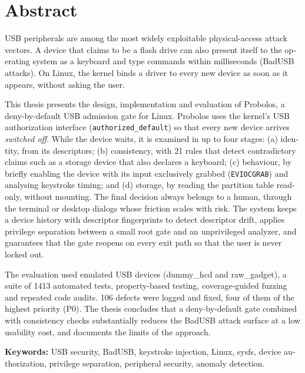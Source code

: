 \chapter*{Abstract}
\thispagestyle{plain}

\begin{english}
USB peripherals are among the most widely exploitable physical-access attack
vectors. A device that claims to be a flash drive can also present itself to the
operating system as a keyboard and type commands within milliseconds (BadUSB
attacks). On Linux, the kernel binds a driver to every new device as soon as it
appears, without asking the user.

This thesis presents the design, implementation and evaluation of
\textsf{Probolos}, a deny-by-default USB admission gate for Linux. Probolos uses
the kernel's USB authorization interface (\texttt{authorized\_default}) so that
every new device arrives \emph{switched off}. While the device waits, it is
examined in up to four stages: (a) identity, from its descriptors; (b)
consistency, with 21 rules that detect contradictory claims such as a storage
device that also declares a keyboard; (c) behaviour, by briefly enabling the
device with its input exclusively grabbed (\texttt{EVIOCGRAB}) and analysing
keystroke timing; and (d) storage, by reading the partition table read-only,
without mounting. The final decision always belongs to a human, through the
terminal or desktop dialogs whose friction scales with risk. The system keeps a
device history with descriptor fingerprints to detect descriptor drift, applies
privilege separation between a small root gate and an unprivileged analyzer,
and guarantees that the gate reopens on every exit path so that the user is
never locked out.

The evaluation used emulated USB devices (dummy\_hcd and raw\_gadget), a suite of
1413 automated tests, property-based testing, coverage-guided fuzzing and
repeated code audits. 106 defects were logged and fixed, four of them of the
highest priority (P0). The thesis concludes that a deny-by-default gate combined
with consistency checks substantially reduces the BadUSB attack surface at a low
usability cost, and documents the limits of the approach.

\vspace{0.8cm}
\noindent\textbf{Keywords:} USB security, BadUSB, keystroke injection, Linux,
sysfs, device authorization, privilege separation, peripheral security, anomaly
detection.
\end{english}
